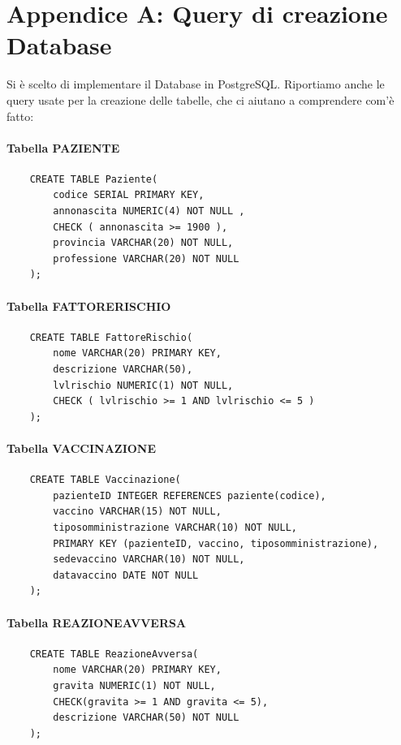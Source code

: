 \documentclass{article}
\begin{document}
\newpage
\section*{Appendice A: Query di creazione Database}

Si è scelto di implementare il Database in PostgreSQL. Riportiamo anche le query usate per la creazione delle tabelle, che ci aiutano a comprendere com'è fatto:
\paragraph*{Tabella PAZIENTE}
\begin{verbatim}
    CREATE TABLE Paziente(
        codice SERIAL PRIMARY KEY,
        annonascita NUMERIC(4) NOT NULL ,
        CHECK ( annonascita >= 1900 ),
        provincia VARCHAR(20) NOT NULL,
        professione VARCHAR(20) NOT NULL
    );
\end{verbatim}
\paragraph*{Tabella FATTORERISCHIO}
\begin{verbatim}
    CREATE TABLE FattoreRischio(
        nome VARCHAR(20) PRIMARY KEY,
        descrizione VARCHAR(50),
        lvlrischio NUMERIC(1) NOT NULL,
        CHECK ( lvlrischio >= 1 AND lvlrischio <= 5 )
    );
\end{verbatim}
\paragraph*{Tabella VACCINAZIONE}
\begin{verbatim}
    CREATE TABLE Vaccinazione(
        pazienteID INTEGER REFERENCES paziente(codice),
        vaccino VARCHAR(15) NOT NULL,
        tiposomministrazione VARCHAR(10) NOT NULL,
        PRIMARY KEY (pazienteID, vaccino, tiposomministrazione),
        sedevaccino VARCHAR(10) NOT NULL,
        datavaccino DATE NOT NULL
    );
\end{verbatim}
\paragraph*{Tabella REAZIONEAVVERSA}
\begin{verbatim}
    CREATE TABLE ReazioneAvversa(
        nome VARCHAR(20) PRIMARY KEY,
        gravita NUMERIC(1) NOT NULL,
        CHECK(gravita >= 1 AND gravita <= 5),
        descrizione VARCHAR(50) NOT NULL
    );
\end{verbatim}
\end{document}
